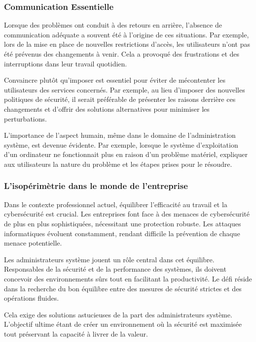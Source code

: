 \subsubsection{Communication Essentielle}
Lorsque des problèmes ont conduit à des retours en arrière, l'absence de communication adéquate a souvent été à l'origine de ces situations.
Par exemple, lors de la mise en place de nouvelles restrictions d'accès, les utilisateurs n'ont pas été prévenus des changements à venir.
Cela a provoqué des frustrations et des interruptions dans leur travail quotidien.

Convaincre plutôt qu'imposer est essentiel pour éviter de mécontenter les utilisateurs des services concernés.
Par exemple, au lieu d'imposer des nouvelles politiques de sécurité, il serait préférable de présenter les raisons derrière ces changements et d'offrir des solutions alternatives pour minimiser les perturbations.

L'importance de l'aspect humain, même dans le domaine de l'administration système, est devenue évidente.
Par exemple, lorsque le système d'exploitation d'un ordinateur ne fonctionnait plus en raison d'un problème matériel, expliquer aux utilisateurs la nature du problème et les étapes prises pour le résoudre.

\subsubsection{L'isopérimètrie dans le monde de l'entreprise}
Dans le contexte professionnel actuel, équilibrer l'efficacité au travail et la cybersécurité est crucial.
Les entreprises font face à des menaces de cybersécurité de plus en plus sophistiquées, nécessitant une protection robuste.
Les attaques informatiques évoluent constamment, rendant difficile la prévention de chaque menace potentielle.

Les administrateurs système jouent un rôle central dans cet équilibre.
Responsables de la sécurité et de la performance des systèmes, ils doivent concevoir des environnements sûrs tout en facilitant la productivité.
Le défi réside dans la recherche du bon équilibre entre des mesures de sécurité strictes et des opérations fluides.

Cela exige des solutions astucieuses de la part des administrateurs système.
L'objectif ultime étant de créer un environnement où la sécurité est maximisée tout préservant la capacité à livrer de la valeur.

